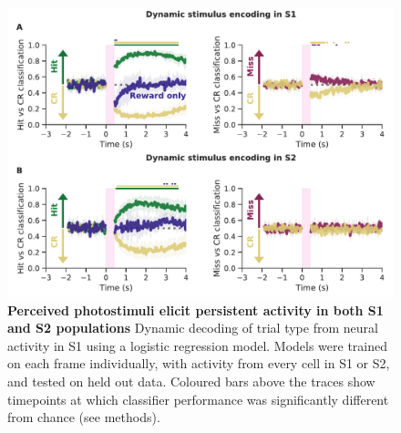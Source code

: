 \begin{figure}[!h]
\hspace*{-0.2in}
\includegraphics[scale=0.76]{figures/Figure3.pdf}
\caption[\textbf{Perceived photostimuli elicit persistent activity in both S1 and S2 populations.
}]{\textbf{Perceived photostimuli elicit persistent activity in both S1 and S2 populations} Dynamic decoding of trial type from neural activity in S1 using a logistic regression model. Models were trained on each frame individually, with activity from every cell in S1 or S2, and tested on held out data. Coloured bars above the traces show timepoints at which classifier performance was significantly different from chance (see methods).
}
\end{figure}
